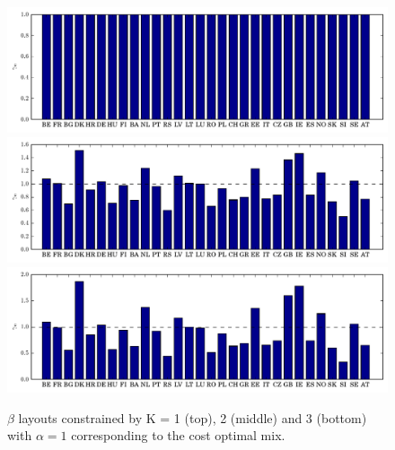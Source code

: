 \documentclass[a4paper, 12pt, sort&compress]{elsarticle}%
\newcommand{\chromowidth}{1.05 \columnwidth}
\begin{document}


\begin{figure}
  \centering
  \includegraphics[width = \chromowidth, center]{k=1cfMax}
  \includegraphics[width = \chromowidth, center]{k=2beta}
  \includegraphics[width = \chromowidth, center]{k=3beta}
  \caption{$\beta$ layouts constrained by K = 1 (top), 2 (middle) and
    3 (bottom) with $\alpha = 1$ corresponding to the cost optimal mix. }
  \label{fig:beta}
\end{figure}
\end{document}
